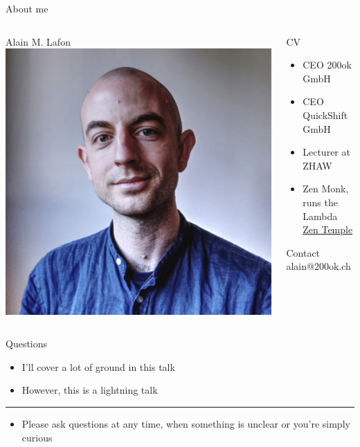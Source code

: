 \documentclass[bigger]{beamer}
\begin{document}
\begin{frame}[label=sec-1-1]{About me}
\begin{columns}
\begin{column}{0.45\textwidth}
\begin{block}{Alain M. Lafon}
\includegraphics[width=.9\linewidth]{images/alain.jpg}
\end{block}
\end{column}

\begin{column}{0.45\textwidth}
\begin{block}{CV}
\begin{itemize}
\item CEO 200ok GmbH
\item CEO QuickShift GmbH
\item Lecturer at ZHAW
\item Zen Monk, runs the Lambda \href{http://zen-temple.net/zen-temples/lambda-zen-temple/introduction/}{Zen Temple}
\end{itemize}

\begin{block}{Contact}
alain@200ok.ch
\end{block}
\end{block}
\end{column}
\end{columns}
\end{frame}
\begin{frame}[label=sec-1-2]{Questions}
\begin{itemize}
\item I'll cover a lot of ground in this talk
\item However, this is \alert{a lightning talk}
\end{itemize}

\center\rule{0.5\paperwidth}{0.4pt}

\begin{itemize}
\item Please \alert{ask questions} at any time, when something is unclear or
you're simply curious
\end{itemize}
\end{frame}
\end{document}
